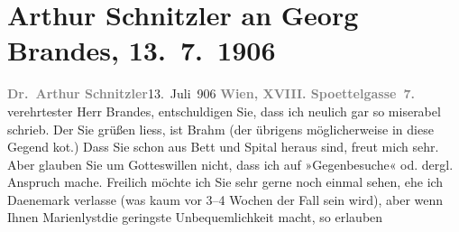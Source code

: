 

         
         \renewcommand{\erwaehntePersonen}{Personen: Otto Brahm, Georg Brandes}
         \renewcommand{\erwaehnteOrte}{Orte: Dänemark, Edmund-Weiß-Gasse 7, Kopenhagen, Marienlyst, Schweden, Skodsborg}
         \renewcommand{\erwaehnteWerke}{}
               \section[Arthur Schnitzler an Georg Brandes, 13. 7. 1906]{ Arthur Schnitzler an Georg Brandes, 13. 7. 1906}\nopagebreak{}\rehead{ }\begin{ledgroupsized}[t]{13cm}\normalsize\beginnumbering{} \toendnotes[C]{\smallbreak\pagebreak[2]} 
\pstart
           \noindent{}{\pb}\textcolor{gray}{\textbf{Dr. Arthur Schnitzler}}\hfill 13. Juli 906\pend
           \pstart
           \textcolor{gray}{\textbf{Wien, XVIII. Spoettelgasse 7.}}\pend
           \pstart{}verehrtester Herr Brandes,\pend\pstart
           entschuldigen Sie, dass ich neulich gar so miserabel schrieb. Der Sie grüßen liess,
               ist Brahm (der übrigens möglicherweise in
               diese Gegend ko{\geminationm}t.) Dass Sie schon aus Bett und Spital
               heraus sind, freut mich sehr. Aber glauben Sie um Gotteswillen nicht, dass ich auf
               »Gegenbesuche« od. dergl. Anspruch mache. Freilich möchte ich Sie sehr gerne noch
               einmal sehen, ehe ich Daenemark verlasse (was
               kaum vor 3–4 Wochen der Fall sein wird), aber wenn Ihnen Marienlystdie geringste Unbequemlichkeit macht, so erlauben

\end{ledgroupsized}
